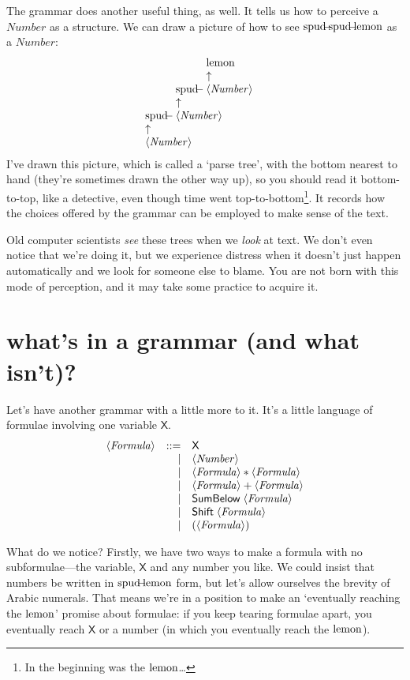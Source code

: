 \documentclass{book}
\begin{document}
\newcommand{\nta}[2]{\begin{array}[b]{l} #2\\ \uparrow\\ \nt{#1}\end{array}}
The grammar does another useful thing, as well. It tells us how to perceive a $\mathit{Number}$ as a structure. We can draw a picture of how to see $\spud\spud\lemon$ as a $\mathit{Number}$:
\[\nta{Number}{\spud\nta{Number}{\spud\nta{Number}{\lemon}}}\]
I've drawn this picture, which is called a `parse tree', with the bottom nearest to hand (they're sometimes drawn the other way up), so you should read it bottom-to-top, like a detective, even though time went top-to-bottom\footnote{In the beginning was the $\mbox{lemon}$\ldots}. It records how the choices offered by the grammar can be employed to make sense of the text.

Old computer scientists \emph{see} these trees when we \emph{look} at text. We don't even notice that we're doing it, but we experience distress when it doesn't just happen automatically and we look for someone else to blame. You are not born with this mode of perception, and it may take some practice to acquire it.


\section{what's in a grammar (and what isn't)?}

\newcommand{\X}{\mathsf{X}}
\newcommand{\SB}{\mathsf{SumBelow}\;}
\newcommand{\SH}{\mathsf{Shift}\;}
Let's have another grammar with a little more to it. It's a little language of formulae involving one variable $\X$.
\[\begin{array}{rrl}
\nt{Formula}
& ::= & \X \\
&   | & \nt{Number} \\
&   | & \nt{Formula} * \nt{Formula} \\
&   | & \nt{Formula} + \nt{Formula} \\
&   | & \SB \nt{Formula} \\
&   | & \SH \nt{Formula} \\
&   | & (\nt{Formula})
\end{array}\]

What do we notice? Firstly, we have two ways to make a formula with no subformulae---the variable, $\X$ and any number you like. We could insist that numbers be written in $\mbox{spud}\!\!\!-\!\!\!\mbox{lemon}$ form, but let's allow ourselves the brevity of Arabic numerals. That means we're in a position to make an `eventually reaching the $\mbox{lemon}$' promise about formulae: if you keep tearing formulae apart, you eventually reach $\X$ or a number (in which you eventually reach the $\mbox{lemon}$).
\end{document}
